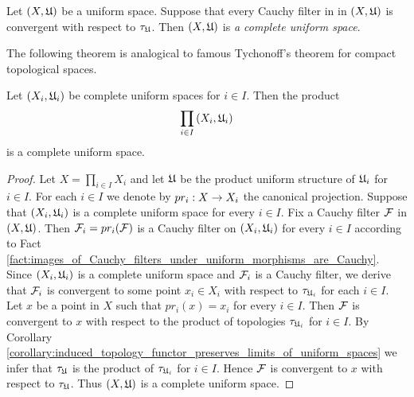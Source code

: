 \begin{definition}
Let $(X,{\mathfrak U})$ be a uniform space. Suppose that every Cauchy filter in in $\left(X,{\mathfrak U}\right)$ is convergent with respect to $\tau_{{\mathfrak U}}$. Then $\left(X,{\mathfrak U}\right)$ is \textit{a complete uniform space}. 
\end{definition}
\noindent
The following theorem is analogical to famous Tychonoff's theorem for compact topological spaces.

\begin{theorem}\label{theorem:completeness_of_factors_imply_product_completeness}
Let $\left(X_i,{\mathfrak U}_i\right)$ be complete uniform spaces for $i \in I$. Then the product
$$\prod_{i\in I}\left(X_i,{\mathfrak U}_i\right)$$
is a complete uniform space.
\end{theorem}
\begin{proof}
Let $X = \prod_{i\in I}X_i$ and let ${\mathfrak U}$ be the product uniform structure of ${\mathfrak U}_i$ for $i\in I$. For each $i\in I$ we denote by $pr_i:X\rightarrow X_i$ the canonical projection. Suppose that $\left(X_i,{\mathfrak U}_i\right)$ is a complete uniform space for every $i\in I$. Fix a Cauchy filter ${\mathcal F}$ in $\left(X,{\mathfrak U}\right)$. Then ${\mathcal F}_i = pr_i({\mathcal F})$ is a Cauchy filter on $\left(X_i,{\mathfrak U}_i\right)$ for every $i\in I$ according to Fact \ref{fact:images_of_Cauchy_filters_under_uniform_morphisms_are_Cauchy}. Since $\left(X_i,{\mathfrak U}_i\right)$ is a complete uniform space and ${\mathcal F}_i$ is a Cauchy filter, we derive that ${\mathcal F}_i$ is convergent to some point $x_i \in X_i$ with respect to $\tau_{{\mathfrak U}_i}$ for each $i\in I$. Let $x$ be a point in $X$ such that $pr_i(x) = x_i$ for every $i \in I$. Then ${\mathcal F}$ is convergent to $x$ with respect to the product of topologies $\tau_{{\mathfrak U}_i}$ for $i\in I$. By Corollary \ref{corollary:induced_topology_functor_preserves_limits_of_uniform_spaces} we infer that $\tau_{{\mathfrak U}}$ is the product of $\tau_{{\mathfrak U}_i}$ for $i\in I$. Hence ${\mathcal F}$ is convergent to $x$ with respect to $\tau_{{\mathfrak U}}$. Thus $(X,{\mathfrak U})$ is a complete uniform space.
\end{proof}

